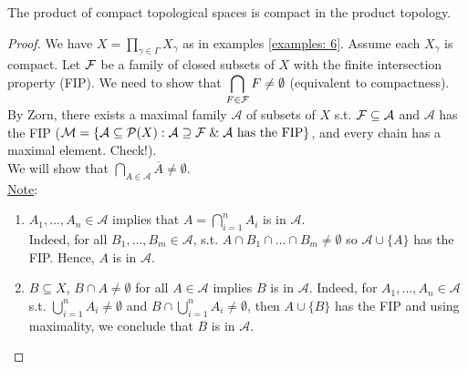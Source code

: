 \documentclass{article}
\begin{document}
\begin{theorem}[Tychonov]\label{thm: Tychonov}
    The product of compact topological spaces is compact in the product topology.
\end{theorem}

\begin{proof}
    We have $X = \displaystyle\prod_{\gamma\in\Gamma}X_\gamma$ as in examples \ref{examples: 6}. Assume each $X_\gamma$ is compact. Let $\mathcal{F}$ be a family of closed subsets of $X$ with the finite intersection property (FIP). We need to show that $\displaystyle\bigcap_{F\in\mathcal{F}}F\neq \emptyset$ (equivalent to compactness). \\
    By Zorn, there exists a maximal family $\mathcal{A}$ of subsets of $X$ s.t. $\mathcal{F}\subseteq\mathcal{A}$ and $\mathcal{A}$ has the FIP ($\mathcal{M}=\{\mathcal{A}\subseteq\mathcal
    {P}(X):\mathcal{A}\supseteq \mathcal{F} \;\&\; \mathcal{A} \text{ has the FIP}\}$, and every chain has a maximal element. Check!).\\
    We will show that $\displaystyle\bigcap_{A\in\mathcal{A}}\overline{A}\neq \emptyset$.\\

    \noindent\underline{Note}:
    \begin{enumerate}
    \item $A_1,\dots, A_n\in\mathcal{A}$ implies that $A = \displaystyle\bigcap^n_{i=1}A_i$ is in $\mathcal{A}$.\\
    Indeed, for all $B_1,\dots, B_m\in\mathcal{A}$, s.t. $A\cap B_1\cap \dots\cap B_m\neq \emptyset$ so $\mathcal{A}\displaystyle\cup \{A\}$ has the FIP. Hence, $A$ is in $\mathcal{A}$.
    \item $B\subseteq X$, $B\cap A\neq \emptyset$ for all $A\in\mathcal{A}$ implies $B$ is in $\mathcal{A}$. Indeed, for $A_1,\dots, A_n\in\mathcal{A}$ s.t. $\displaystyle\bigcup^n_{i=1} A_i\neq \emptyset$ and  $B\cap \displaystyle\bigcup^n_{i=1} A_i\neq \emptyset$, then $A\displaystyle\cup\{B\}$ has the FIP and using maximality, we conclude that $B$ is in $\mathcal{A}$.
    \end{enumerate}


\end{proof}
\end{document}
